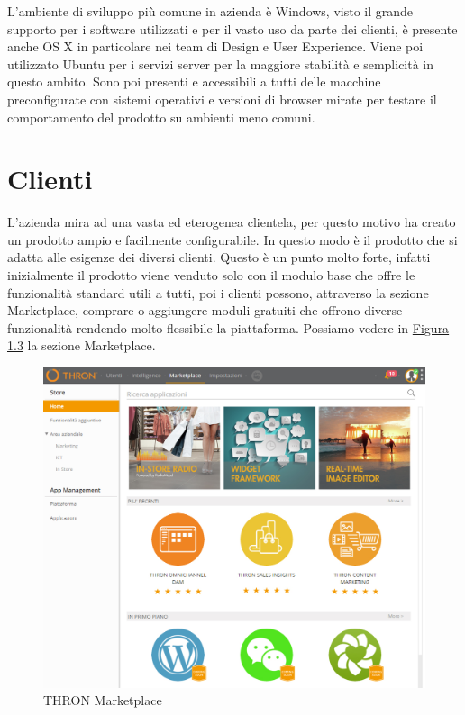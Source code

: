 \documentclass[a4paper, 12pt, twoside, openright]{book}
\begin{document}
L'ambiente di sviluppo più comune in azienda è Windows, visto il grande supporto per i software utilizzati e per il vasto uso da parte dei clienti, è presente anche OS X in particolare nei team di Design e User Experience. Viene poi utilizzato Ubuntu per i servizi server per la maggiore stabilità e semplicità in questo ambito. Sono poi presenti e accessibili a tutti delle macchine preconfigurate con sistemi operativi e versioni di browser mirate per testare il comportamento del prodotto su ambienti meno comuni.

\newpage{}
\section{Clienti}
L'azienda mira ad una vasta ed eterogenea clientela, per questo motivo ha creato un prodotto ampio e facilmente configurabile. In questo modo è il prodotto che si adatta alle esigenze dei diversi clienti. Questo è un punto molto forte, infatti inizialmente il prodotto viene venduto solo con il modulo base che offre le funzionalità standard utili a tutti, poi i clienti possono, attraverso la sezione Marketplace, comprare o aggiungere moduli gratuiti che offrono diverse funzionalità rendendo molto flessibile la piattaforma. Possiamo vedere in \hyperref[thron-marketplace]{Figura 1.3} la sezione Marketplace.
\begin{figure}[H]
	\centering
	\label{thron-marketplace}
	\includegraphics[width=1.0\textwidth]{images/thron-marketplace.jpg}
	\caption{THRON Marketplace}
\end{figure}
\end{document}
